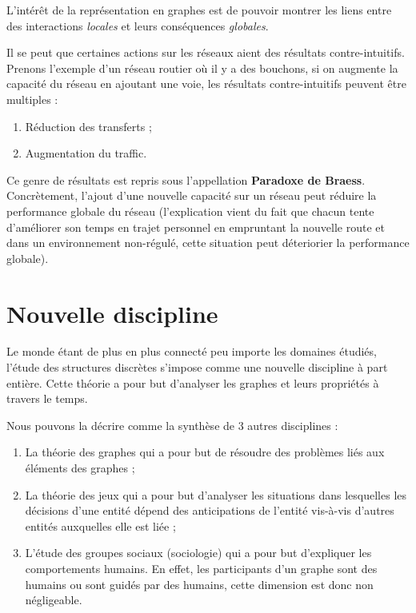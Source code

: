 L'intérêt de la représentation en graphes est de pouvoir montrer les
liens entre des interactions \textit{locales} et leurs conséquences
\textit{globales}. \newline

Il se peut que certaines actions sur les réseaux aient des résultats
contre-intuitifs. Prenons l'exemple d'un réseau routier où il y a des
bouchons, si on augmente la capacité du réseau en ajoutant une voie, les
résultats contre-intuitifs peuvent être multiples :

\begin{enumerate}
    \item Réduction des transferts ;
    \item Augmentation du traffic.
\end{enumerate}

Ce genre de résultats est repris sous l'appellation \textbf{Paradoxe de
Braess}. Concrètement, l'ajout d'une nouvelle capacité sur un réseau
peut réduire la performance globale du réseau (l'explication vient du
fait que chacun tente d'améliorer son temps en trajet personnel en
empruntant la nouvelle route et dans un environnement non-régulé, cette
situation peut déteriorier la performance globale).

\section{Nouvelle discipline}

Le monde étant de plus en plus connecté peu importe les domaines
étudiés, l'étude des structures discrètes s'impose comme une nouvelle discipline à
part entière. Cette théorie a pour but d'analyser les graphes et leurs
propriétés à travers le temps. \newline

Nous pouvons la décrire comme la synthèse de 3 autres disciplines :

\begin{enumerate}
	\item La théorie des graphes qui a pour but de résoudre des
	    problèmes liés aux éléments des graphes ;
	\item La théorie des jeux qui a pour but d'analyser les situations
	    dans lesquelles les décisions d'une entité dépend des
	    anticipations de l'entité vis-à-vis d'autres entités auxquelles
	    elle est liée ;
	\item L'étude des groupes sociaux (sociologie) qui a pour but
	    d'expliquer les comportements humains. En effet, les
	    participants d'un graphe sont des humains ou sont guidés par des
	    humains, cette dimension est donc non négligeable.
\end{enumerate}

